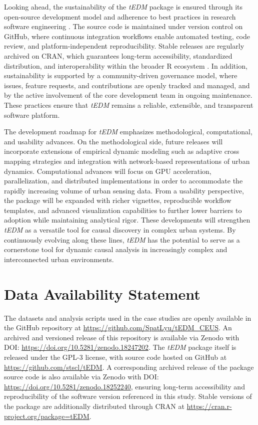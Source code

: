 \documentclass[authoryear,preprint,review,12pt]{elsarticle}
\begin{document}
Looking ahead, the sustainability of the \textit{tEDM} package is ensured through its open-source development model and adherence to best practices in research software engineering \citep{ropensci}. The source code is maintained under version control on GitHub, where continuous integration workflows enable automated testing, code review, and platform-independent reproducibility. Stable releases are regularly archived on CRAN, which guarantees long-term accessibility, standardized distribution, and interoperability within the broader R ecosystem \citep{r}. In addition, sustainability is supported by a community-driven governance model, where issues, feature requests, and contributions are openly tracked and managed, and by the active involvement of the core development team in ongoing maintenance. These practices ensure that \textit{tEDM} remains a reliable, extensible, and transparent software platform.

The development roadmap for \textit{tEDM} emphasizes methodological, computational, and usability advances. On the methodological side, future releases will incorporate extensions of empirical dynamic modeling such as adaptive cross mapping strategies and integration with network-based representations of urban dynamics. Computational advances will focus on GPU acceleration, parallelization, and distributed implementations in order to accommodate the rapidly increasing volume of urban sensing data. From a usability perspective, the package will be expanded with richer vignettes, reproducible workflow templates, and advanced visualization capabilities to further lower barriers to adoption while maintaining analytical rigor. These developments will strengthen \textit{tEDM} as a versatile tool for causal discovery in complex urban systems. By continuously evolving along these lines, \textit{tEDM} has the potential to serve as a cornerstone tool for dynamic causal analysis in increasingly complex and interconnected urban environments.

\section*{Data Availability Statement}

The datasets and analysis scripts used in the case studies are openly available in the GitHub repository at \url{https://github.com/SpatLyu/tEDM_CEUS}. An archived and versioned release of this repository is available via Zenodo with DOI: \url{https://doi.org/10.5281/zenodo.18247202}. The \textit{tEDM} package itself is released under the GPL-3 license, with source code hosted on GitHub at \url{https://github.com/stscl/tEDM}. A corresponding archived release of the package source code is also available via Zenodo with DOI: \url{https://doi.org/10.5281/zenodo.18252240}, ensuring long-term accessibility and reproducibility of the software version referenced in this study. Stable versions of the package are additionally distributed through CRAN at \url{https://cran.r-project.org/package=tEDM}.
\end{document}
